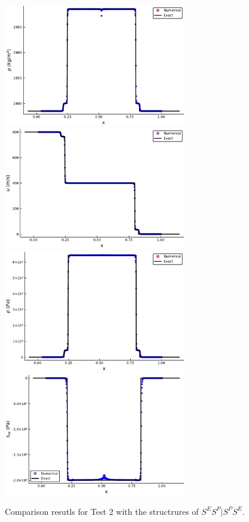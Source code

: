 \documentclass{article}
\numberwithin{equation}{section}
\numberwithin{table}{section}
\begin{document}
\begin{figure}
  \centering
  \includegraphics[width= 8cm] {case2rho.pdf}
  \includegraphics[width= 8cm] {case2u.pdf}
  \includegraphics[width= 8cm] {case2p.pdf}
  \includegraphics[width= 8cm] {case2sxx.pdf}
  \caption{Comparison resutls for Test 2 with the structrures of $S^ES^P|S^PS^E$.  }
  \label{fig:case2}
\end{figure}
\end{document}
